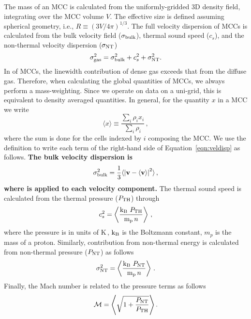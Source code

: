 \IfFileExists{emulateapjlegacy.cls}{\documentclass[iop]{emulateapjlegacy}}{\documentclass[iop]{emulateapj}}
\begin{document}
The mass of an MCC is calculated from the uniformly-gridded 3D density field, integrating over the MCC volume $V$. The effective size is defined assuming spherical geometry, i.e., $R \equiv (3 V /4 \pi)^{1/3}$.
%
The full velocity dispersion of MCCs is calculated from the bulk velocity field ($\sigma_{\rm bulk}$), thermal sound speed ($c_s$), and the non-thermal velocity dispersion ($\sigma_{\rm NT}$)
\begin{equation}
\sigma_{\rm gas}^2 = \sigma_{\rm bulk}^2 + c_s^2 + \sigma_{\rm NT}^2.
\label{eqn:veldisp}
\end{equation}
%
In \obs of MCCs, the linewidth contribution of dense gas exceeds that from the diffuse gas. Therefore, when calculating the global quantities of MCCs, we always perform a mass-weighting. Since we operate on data on a uni-grid, this is equivalent to density averaged quantities. In general, for the quantity $x$ in a MCC we write
\begin{equation}\label{eqn:defineaverage}
\langle x \rangle \equiv \frac{\sum_{i} \rho_i x_i }{\sum_i \rho_i}\,,
\end{equation}
where the sum is done for the cells indexed by $i$ composing the MCC.
We use the definition  to write each term of the right-hand side of Equation~\ref{eqn:veldisp} as follows.
%
{\bf The bulk velocity dispersion is
\begin{equation}
\sigma_{\rm bulk}^2 = \frac{1}{{3}} \langle \left|\mathbf{v} - \langle \mathbf{v} \rangle  \right|^2\rangle \,,
\end{equation}
where  is applied to each velocity component.
}
%
The thermal sound speed is calculated from the thermal pressure ($P_{\rm TH}$) through
\begin{equation}
c_s^2 = \left\langle \frac{{\rm k_B} ~P_{\rm TH}}{{\rm m_p}\, n} \right\rangle\,,
\end{equation}
where the pressure is in units of K\,\cc, $\rm k_B$ is the Boltzmann constant, $m_p$ is the mass of a proton. Similarly, contribution from non-thermal energy is calculated from non-thermal pressure ($P_{\rm NT}$) as follows
\begin{equation}
\sigma_{\rm NT}^2 = \left\langle \frac{{\rm k_B} ~P_{\rm NT}}{{\rm m_p}\, n}\right\rangle\,.
\end{equation}
%
Finally, the Mach number is related to the pressure terms as follows
\begin{equation}
\mathcal{M} = \left\langle \sqrt{ 1 + \frac{P_{\rm NT}}{P_{\rm TH}}} \right\rangle.
\label{eqn:MPress}
\end{equation}
\end{document}
